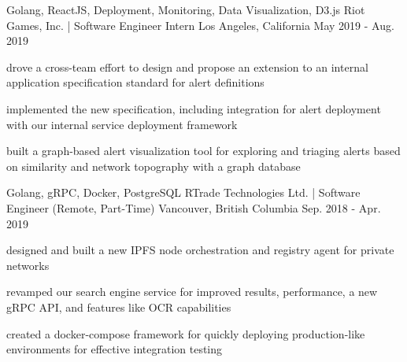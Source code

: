 

\begin{cventries}

  \cventry
    {Golang, ReactJS, Deployment, Monitoring, Data Visualization, D3.js} %
    {Riot Games, Inc. | Software Engineer Intern} %
    {Los Angeles, California} %
    {May 2019 - Aug. 2019} %
    {
      \begin{cvitems} %
        \item {drove a cross-team effort to design and propose an extension to an internal application specification standard for alert definitions}
        \item{implemented the new specification, including integration for alert deployment with our internal service deployment framework}
        \item {built a graph-based alert visualization tool for exploring and triaging alerts based on similarity and network topography with a graph database}
      \end{cvitems}
    }

  \cventry
    {Golang, gRPC, Docker, PostgreSQL} %
    {RTrade Technologies Ltd. | Software Engineer (Remote, Part-Time)} %
    {Vancouver, British Columbia} %
    {Sep. 2018 - Apr. 2019} %
    {
      \begin{cvitems} %
        \item {designed and built a new IPFS node orchestration and registry agent for private networks}
        \item {revamped our search engine service for improved results, performance, a new gRPC API, and features like OCR capabilities}
        \item {created a docker-compose framework for quickly deploying production-like environments for effective integration testing}
      \end{cvitems}
    }


\end{cventries}
